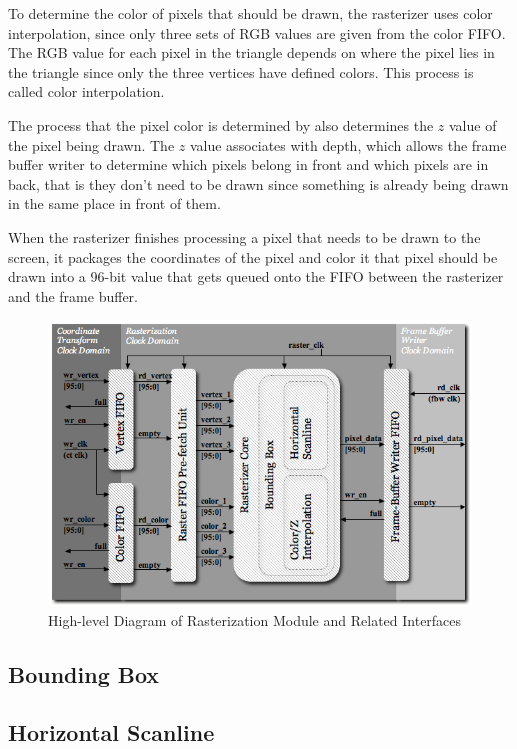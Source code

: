 \documentclass[letterpaper,10pt]{article}
\begin{document}
To determine the color of pixels that should be drawn, the rasterizer uses color interpolation, since only three sets of RGB values are given from the color FIFO. The RGB value for each pixel in the triangle depends on where the pixel lies in the triangle since only the three vertices have defined colors. This process is called color interpolation. 

The process that the pixel color is determined by also determines the $z$ value of the pixel being drawn. The $z$ value associates with depth, which allows the frame buffer writer to determine which pixels belong in front and which pixels are in back, that is they don't need to be drawn since something is already being drawn in the same place in front of them. 

When the rasterizer finishes processing a pixel that needs to be drawn to the screen, it packages the coordinates of the pixel and color it that pixel should be drawn into a 96-bit value that gets queued onto the FIFO between the rasterizer and the frame buffer. 

\begin{figure}[h!]
\begin{center}
\includegraphics[scale=.80]{raster_high_level.png}
\end{center}
\caption{High-level Diagram of Rasterization Module and Related Interfaces}
\label{fig:buffer_space}
\end{figure}

\subsection{Bounding Box}
\subsection{Horizontal Scanline}
\end{document}
